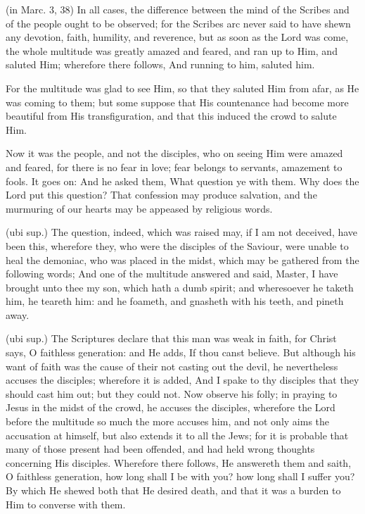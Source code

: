  (in Marc. 3, 38) In all cases, the difference between the mind of the Scribes and of the people ought to be observed; for the Scribes arc never said to have shewn any devotion, faith, humility, and reverence, but as soon as the Lord was come, the whole multitude was greatly amazed and feared, and ran up to Him, and saluted Him; wherefore there follows, And running to him, saluted him.

 For the multitude was glad to see Him, so that they saluted Him from afar, as He was coming to them; but some suppose that His countenance had become more beautiful from His transfiguration, and that this induced the crowd to salute Him.

 Now it was the people, and not the disciples, who on seeing Him were amazed and feared, for there is no fear in love; fear belongs to servants, amazement to fools. It goes on: And he asked them, What question ye with them. Why does the Lord put this question? That confession may produce salvation, and the murmuring of our hearts may be appeased by religious words.

 (ubi sup.) The question, indeed, which was raised may, if I am not deceived, have been this, wherefore they, who were the disciples of the Saviour, were unable to heal the demoniac, who was placed in the midst, which may be gathered from the following words; And one of the multitude answered and said, Master, I have brought unto thee my son, which hath a dumb spirit; and wheresoever he taketh him, he teareth him: and he foameth, and gnasheth with his teeth, and pineth away.

 (ubi sup.) The Scriptures declare that this man was weak in faith, for Christ says, O faithless generation: and He adds, If thou canst believe. But although his want of faith was the cause of their not casting out the devil, he nevertheless accuses the disciples; wherefore it is added, And I spake to thy disciples that they should cast him out; but they could not. Now observe his folly; in praying to Jesus in the midst of the crowd, he accuses the disciples, wherefore the Lord before the multitude so much the more accuses him, and not only aims the accusation at himself, but also extends it to all the Jews; for it is probable that many of those present had been offended, and had held wrong thoughts concerning His disciples. Wherefore there follows, He answereth them and saith, O faithless generation, how long shall I be with you? how long shall I suffer you? By which He shewed both that He desired death, and that it was a burden to Him to converse with them.

